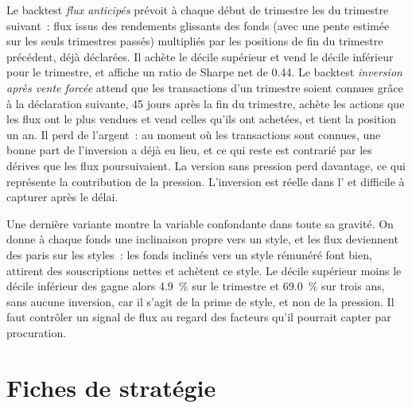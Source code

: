 Le backtest \emph{flux anticipés} prévoit à chaque début de trimestre les  du trimestre suivant~: flux issus des rendements glissants des fonds (avec une pente
estimée sur les seuls trimestres passés) multipliés par les positions de fin du trimestre précédent, déjà déclarées. Il achète le décile supérieur et vend le décile inférieur pour le trimestre,
et affiche un ratio de Sharpe net de 0.44. Le backtest \emph{inversion après vente forcée} attend que les transactions d'un trimestre soient connues grâce à la déclaration suivante, 45 jours après la fin du trimestre,
achète les actions que les flux ont le plus vendues et vend celles qu'ils ont achetées, et tient la position un an. Il perd de l'argent~: au moment où les transactions sont connues, une bonne part de
l'inversion a déjà eu lieu, et ce qui reste est contrarié par les dérives que les flux poursuivaient. La version sans pression perd davantage, ce qui représente la
contribution de la pression. L'inversion est réelle dans l' et difficile à capturer après le délai.

Une dernière variante montre la variable confondante dans toute sa gravité. On donne à chaque fonds une inclinaison propre vers un style, et les flux deviennent des paris sur les styles~: les fonds inclinés vers un style rémunéré font
bien, attirent des souscriptions nettes et achètent ce style. Le décile supérieur moins le décile inférieur des  gagne alors 4.9~\% sur le trimestre et 69.0~\% sur trois ans,
sans aucune inversion, car il s'agit de la prime de style, et non de la pression. Il faut contrôler un signal de flux au regard des facteurs qu'il pourrait capter par procuration.

\section{Fiches de stratégie}

